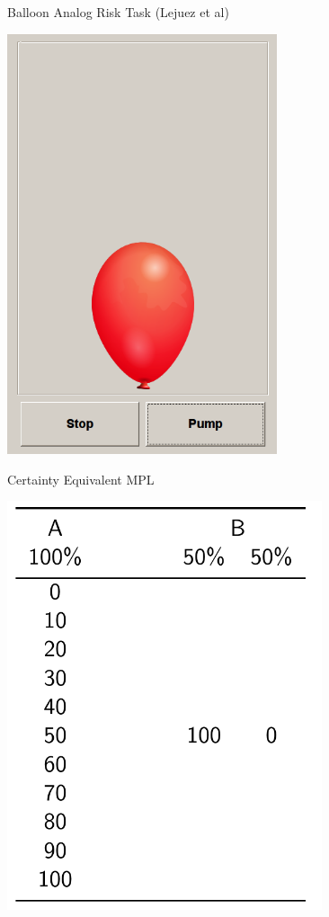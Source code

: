 \documentclass[
  ignorenonframetext,
]{beamer}
\begin{document}
\begin{frame}{Balloon Analog Risk Task (Lejuez et al)}
\protect\hypertarget{balloon-analog-risk-task-lejuez-et-al}{}

\includegraphics[width=3.125in,height=\textheight]{BART.png}

\end{frame}

\begin{frame}{Certainty Equivalent MPL}
\protect\hypertarget{certainty-equivalent-mpl}{}

\includegraphics[width=3.64583in,height=\textheight]{CEPL.png}

\end{frame}
\end{document}
